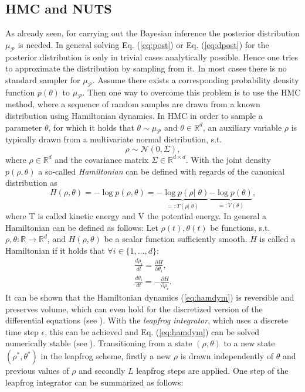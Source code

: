 \documentclass[12pt,letterpaper]{article}
\numberwithin{equation}{subsection}
\begin{document}
\subsection{HMC and NUTS}
As already seen, for carrying out the Bayesian inference the posterior distribution $\mu_\mathcal{P}$ is needed. In general solving Eq.  (\ref{eq:post}) or Eq. (\ref{eq:dpost}) for the posterior distribution is only in trivial cases analytically possible. Hence one tries to approximate the distribution by sampling from it. In most cases there is no standard sampler for $\mu_\mathcal{P}$. Assume there exists a corresponding probability density function $p(\theta)$ to $\mu_\mathcal{P}$. Then one way to overcome this problem is to use the HMC method, where a sequence of random samples are drawn from a known distribution using Hamiltonian dynamics. In HMC in order to sample a parameter $\theta$, for which it holds that $\theta \sim \mu_\mathcal{P}$ and $\theta \in \mathbb{R}^d$, an auxiliary variable $\rho$ is typically drawn from a multivariate normal distribution, s.t.
\begin{equation}
\rho \sim \mathcal{N}(0,\Sigma), 
\end{equation}
where $\rho \in \mathbb{R}^d$ and the covariance matrix $\Sigma \in \mathbb{R}^{d \times d}$. With the joint density $p(\rho, \theta)$ a so-called \textit{Hamiltonian} can be defined with regards of the canonical distribution as
\begin{equation}
H(\rho, \theta) = -\log p(\rho, \theta) = \underbrace{-\log p(\rho |\; \theta)}_{=:T(\rho |\; \theta)} \underbrace{-\log p(\theta)}_{=:V(\theta)},
\end{equation}
where T is called kinetic energy and V the potential energy. In general a Hamiltonian can be defined as follows:
Let $\rho(t),\theta(t)$ be functions, s.t. $\rho,\theta:\mathbb{R} \rightarrow \mathbb{R}^d$, and $H(\rho,\theta)$ be a scalar function sufficiently smooth.
$H$ is called a Hamiltonian if it holds that $\forall i \in \{1,\dots,d\}:$
\begin{equation}
\label{eq:hamdym}
\begin{aligned}
\frac{d \rho_i }{dt} = \frac{\partial H}{\partial \theta_i}, \\
\frac{d \theta_i }{dt} = -\frac{\partial H}{\partial \rho_i}.
\end{aligned}
\end{equation}
It can be shown that the Hamiltonian dynamics (\ref{eq:hamdym}) is reversible and preserves volume, which can even hold for the discretized version of the differential equations (see \cite{mcmchb}). With the \textit{leapfrog integrator}, which uses a discrete time step $\epsilon$, this can be achieved and Eq. (\ref{eq:hamdym}) can be solved numerically stable (see \cite{mcmchb}). Transitioning from a state $(\rho, \theta)$ to a new state $(\rho^*,\theta^*)$ in the leapfrog scheme, firstly a new  $\rho$ is drawn independently of $\theta$ and previous values of $\rho$ and secondly $L$ leapfrog steps are applied. One step of the leapfrog integrator can be summarized as follows:
\end{document}
